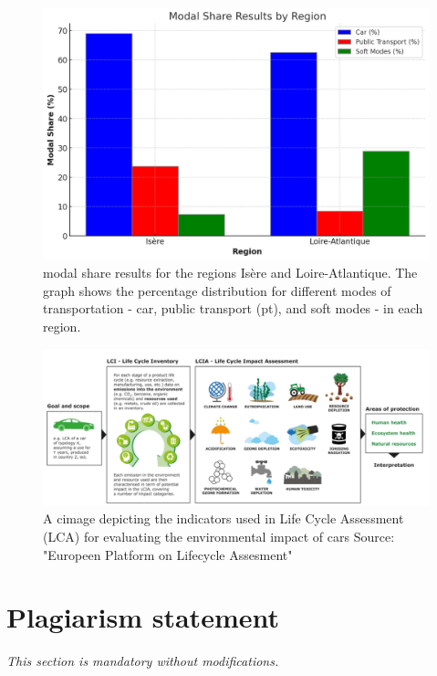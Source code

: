 \documentclass[conference,compsoc]{IEEEtran}
\begin{document}
\begin{figure}[H]
	\centering
	\includegraphics[width=\linewidth]{images/fig3.jpg}
	\caption{modal share results for the regions Isère and Loire-Atlantique. The graph shows the percentage distribution for different modes of transportation - car, public transport (pt), and soft modes - in each region. }
	\label{fig:modal_shared_results}
\end{figure}

\begin{figure}[H]
	\centering
	\includegraphics[width=\linewidth]{images/fig4.png}
	\caption{A cimage depicting the  indicators used in Life Cycle Assessment (LCA) for evaluating the environmental impact of cars Source: "Europeen Platform on Lifecycle Assesment"}
	\label{fig:Life Cycle Assessment (LCA) Categories}
\end{figure}

\section*{Plagiarism statement}
\emph{This section is mandatory without modifications.}
\end{document}
